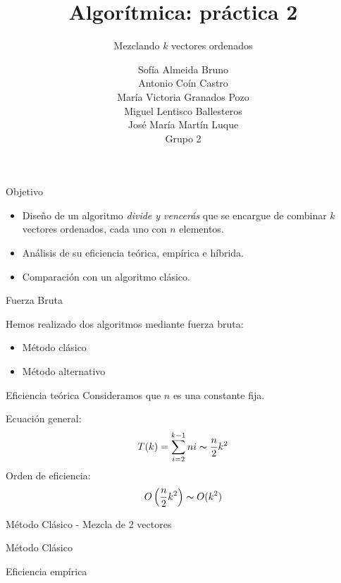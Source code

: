 \documentclass[spanish]{beamer}
\title{Algorítmica: práctica 2}
\subtitle{Mezclando $k$ vectores ordenados}
\author{Sofía Almeida Bruno\\ Antonio Coín Castro\\ María Victoria Granados Pozo\\ Miguel Lentisco Ballesteros\\ José María Martín Luque\\ \vspace{1em}Grupo 2}
\begin{document}
\maketitle

\begin{frame}{Objetivo}

	\begin{itemize}
		\item Diseño de un algoritmo \textit{divide y vencerás} que se encargue de combinar $k$ vectores ordenados, cada uno con $n$ elementos.
		\item Análisis de su eficiencia teórica, empírica e híbrida.
		\item Comparación con un algoritmo clásico.
	\end{itemize}

\end{frame}

\begin{frame}{Fuerza Bruta}

	Hemos realizado dos algoritmos mediante fuerza bruta:
	\begin{itemize}
		\item Método clásico
		\item Método alternativo
	\end{itemize}
\end{frame}

\begin{frame}{Eficiencia teórica}
    \vspace{-1em}
    Consideramos que $n$ es una constante fija.
    
    \vskip 1cm 
	Ecuación general: $$T(k) = \sum_{i=2}^{k-1} ni \thicksim \frac{n}{2}k^2$$
	Orden de eficiencia: $$O\left(\frac{n}{2}k^2\right) \thicksim O(k^2) $$

\end{frame}

\begin{frame}{Método Clásico - Mezcla de 2 vectores}

	
\end{frame}

\begin{frame}{Método Clásico}
	
\end{frame}

\begin{frame}{Eficiencia empírica}
	\begin{center}
		\resizebox*{11cm}{!}{
			}
	\end{center}

\end{frame}
\end{document}
